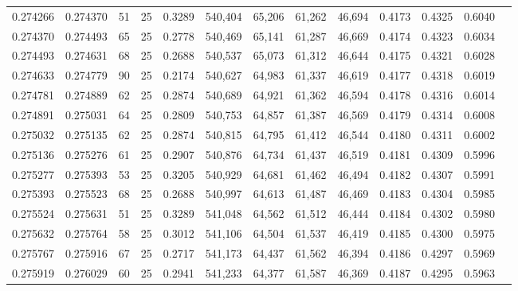 \begin{tabular}{rrrrrrrrrrrrr}
0.274266 & 0.274370 &    51 &  25 &                                     0.3289 & 540,404 &  65,206 &  61,262 &  46,694 & 0.4173 & 0.4325 & 0.6040 \\
0.274370 & 0.274493 &    65 &  25 &                                     0.2778 & 540,469 &  65,141 &  61,287 &  46,669 & 0.4174 & 0.4323 & 0.6034 \\
0.274493 & 0.274631 &    68 &  25 &                                     0.2688 & 540,537 &  65,073 &  61,312 &  46,644 & 0.4175 & 0.4321 & 0.6028 \\
0.274633 & 0.274779 &    90 &  25 &                                     0.2174 & 540,627 &  64,983 &  61,337 &  46,619 & 0.4177 & 0.4318 & 0.6019 \\
0.274781 & 0.274889 &    62 &  25 &                                     0.2874 & 540,689 &  64,921 &  61,362 &  46,594 & 0.4178 & 0.4316 & 0.6014 \\
0.274891 & 0.275031 &    64 &  25 &                                     0.2809 & 540,753 &  64,857 &  61,387 &  46,569 & 0.4179 & 0.4314 & 0.6008 \\
0.275032 & 0.275135 &    62 &  25 &                                     0.2874 & 540,815 &  64,795 &  61,412 &  46,544 & 0.4180 & 0.4311 & 0.6002 \\
0.275136 & 0.275276 &    61 &  25 &                                     0.2907 & 540,876 &  64,734 &  61,437 &  46,519 & 0.4181 & 0.4309 & 0.5996 \\
0.275277 & 0.275393 &    53 &  25 &                                     0.3205 & 540,929 &  64,681 &  61,462 &  46,494 & 0.4182 & 0.4307 & 0.5991 \\
0.275393 & 0.275523 &    68 &  25 &                                     0.2688 & 540,997 &  64,613 &  61,487 &  46,469 & 0.4183 & 0.4304 & 0.5985 \\
0.275524 & 0.275631 &    51 &  25 &                                     0.3289 & 541,048 &  64,562 &  61,512 &  46,444 & 0.4184 & 0.4302 & 0.5980 \\
0.275632 & 0.275764 &    58 &  25 &                                     0.3012 & 541,106 &  64,504 &  61,537 &  46,419 & 0.4185 & 0.4300 & 0.5975 \\
0.275767 & 0.275916 &    67 &  25 &                                     0.2717 & 541,173 &  64,437 &  61,562 &  46,394 & 0.4186 & 0.4297 & 0.5969 \\
0.275919 & 0.276029 &    60 &  25 &                                     0.2941 & 541,233 &  64,377 &  61,587 &  46,369 & 0.4187 & 0.4295 & 0.5963 \\

\end{tabular}
